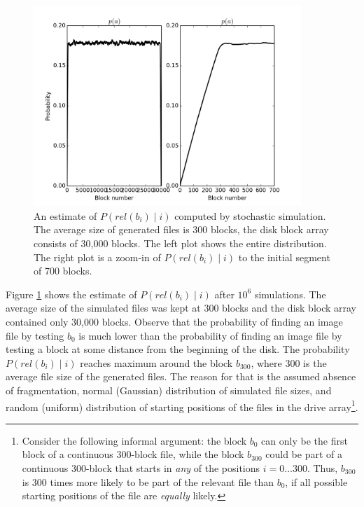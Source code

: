 \documentclass[10pt,a4paper]{article}
\begin{document}
\begin{figure}
  \centerline{\includegraphics[width=0.9\textwidth]{fig4}}
  \caption{An estimate of $P(rel(b_i) \mid i)$ computed by stochastic simulation. The average size of generated files is 300 blocks, the disk block array consists of 30,000 blocks. The left plot shows the entire distribution. The right plot is a zoom-in of  $P(rel(b_i) \mid i)$ to the initial segment of 700 blocks.}
  \label{fig:montecarlo}
\end{figure}

Figure \ref{fig:montecarlo} shows the estimate of $P(rel(b_i) \mid i)$ after $10^6$ simulations. The average size of the simulated files was kept at 300 blocks and the disk block array contained only 30,000 blocks. Observe that the probability of finding an image file by testing $b_0$ is much lower than the probability of finding an image file by testing a block at some distance from the beginning of the disk. The probability $P(rel(b_i) \mid i)$ reaches maximum around the block $b_{300}$, where 300 is the average file size of the generated files. The reason for that is the assumed absence of fragmentation, normal (Gaussian) distribution of simulated file sizes, and random (uniform) distribution of starting positions of the files in the drive array\footnote{Consider the following informal argument: the block $b_0$ can only be the first block of a continuous 300-block file, while the block $b_{300}$ could be part of a continuous 300-block that starts in \emph{any} of the positions $i=0 \dots 300$. Thus, $b_{300}$ is 300 times more likely to be part of the relevant file than $b_0$, if all possible starting positions of the file are \emph{equally} likely.}.  
\end{document}
